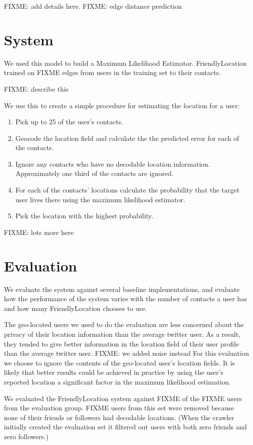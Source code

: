 FIXME: add details here.
FIXME: edge distance prediction

\section{System}
We used this model to build a Maximum Likelihood Estimator.
FriendlyLocation trained on FIXME edges from users in the training set to
their contacts.

FIXME: describe this

We use this to create a simple procedure for estimating the location for a user:
\begin{enumerate}
\item Pick up to 25 of the user's contacts.
\item Geocode the location field and calculate the the predicted error for each
of the contacts.
\item Ignore any contacts who have no decodable location information.
Approximately one third of the contacts are ignored.
\item For each of the contacts' locations calculate the probability that the
target user lives there using the maximum likelihood estimator.
\item Pick the location with the highest probability.
\end{enumerate}

FIXME: lots more here

\section{Evaluation}
We evaluate the system against several baseline implementations, and evaluate
how the performance of the system varies with the number of contacts a user has
and how many FriendlyLocation chooses to use.

The geo-located users we used to do the evaluation are less concerned about the
privacy of their location information than the average twitter user.
As a result, they tended to give better information in the location field of
their user profile than the average twitter user.
FIXME: we added noise instead
For this evaluation we choose to ignore the contents of the geo-located user's
location fields.
It is likely that better results could be achieved in practice
by using the user's reported location a significant factor in the maximum
likelihood estimation.

We evaluated the FriendlyLocation system against FIXME of the FIXME users from
the evaluation group.
FIXME users from this set were removed because none of their friends or
followers had decodable locations.
(When the crawler initially created the evaluation set it filtered out users
with both zero friends and zero followers.)

